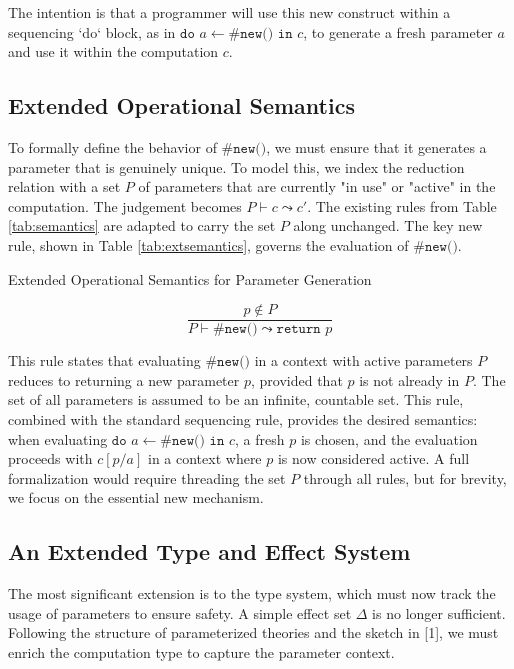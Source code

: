 \documentclass{article}
\begin{document}
The intention is that a programmer will use this new construct within a sequencing `do` block, as in $\texttt{do } a \leftarrow \texttt{\#new()} \texttt{ in } c$, to generate a fresh parameter $a$ and use it within the computation $c$.

\subsection{Extended Operational Semantics}
To formally define the behavior of $\texttt{\#new()}$, we must ensure that it generates a parameter that is genuinely unique. To model this, we index the reduction relation with a set $P$ of parameters that are currently "in use" or "active" in the computation. The judgement becomes $P \vdash c \leadsto c'$. The existing rules from Table \ref{tab:semantics} are adapted to carry the set $P$ along unchanged. The key new rule, shown in Table \ref{tab:extsemantics}, governs the evaluation of $\texttt{\#new()}$.

\begin{table}[h!]
\centering
\caption{Extended Operational Semantics for Parameter Generation}
\label{tab:extsemantics}
$$\frac{p \notin P}{P \vdash \texttt{\#new()} \leadsto \texttt{return } p}$$
\end{table}

This rule states that evaluating $\texttt{\#new()}$ in a context with active parameters $P$ reduces to returning a new parameter $p$, provided that $p$ is not already in $P$. The set of all parameters is assumed to be an infinite, countable set. This rule, combined with the standard sequencing rule, provides the desired semantics: when evaluating $\texttt{do } a \leftarrow \texttt{\#new()} \texttt{ in } c$, a fresh $p$ is chosen, and the evaluation proceeds with $c[p/a]$ in a context where $p$ is now considered active. A full formalization would require threading the set $P$ through all rules, but for brevity, we focus on the essential new mechanism.

\subsection{An Extended Type and Effect System}
The most significant extension is to the type system, which must now track the usage of parameters to ensure safety. A simple effect set $\Delta$ is no longer sufficient. Following the structure of parameterized theories and the sketch in [1], we must enrich the computation type to capture the parameter context.
\end{document}
